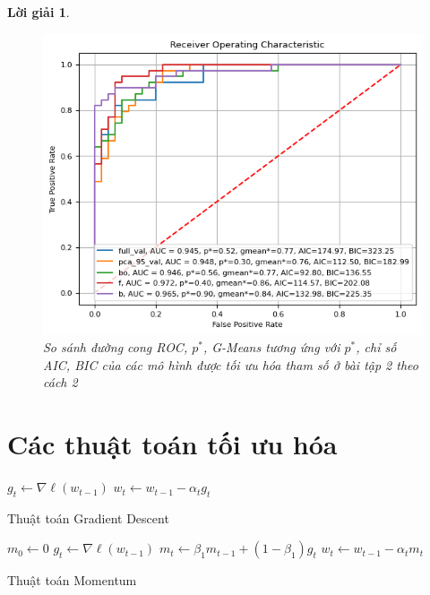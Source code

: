 \documentclass[14pt, a4paper]{article}
\theoremstyle{sltheorem}
\theoremstyle{soltheorem}
\newtheorem*{loigiai}{Lời giải}
\begin{document}
\begin{loigiai}
    \begin{figure}[h!]
        \centering
        \includegraphics[width=1.0\textwidth]{figures/ROC_Curve_AIC_BIC_Excercise_2_2.png}
        \caption{ So sánh đường cong ROC, $p^*$, G-Means tương ứng với $p^*$, chỉ số AIC, BIC của các mô hình được tối ưu hóa tham số ở bài tập 2 theo cách 2}
        \label{fig:ROC_Curve_AIC_BIC_Excercise_2_2}
    \end{figure}
\end{loigiai}

\newpage
\printbibliography[title={TÀI LIỆU THAM KHẢO}]

\newpage
\appendix

\section{Các thuật toán tối ưu hóa} \label{Optimization-Algorithms}


\begin{algorithm}[h!]
    \DontPrintSemicolon

     {
        $g_t \gets \nabla \ell(w_{t-1})$\;
        $w_t \gets w_{t-1} - \alpha_t g_t$
    }
    \;
    \caption{Thuật toán Gradient Descent}
\end{algorithm}


\begin{algorithm}[h!]
    \DontPrintSemicolon
    $m_0 \gets 0$\;
     {
        $g_t \gets \nabla \ell(w_{t-1})$\;
        $m_t \gets \beta_1 m_{t-1} + (1-\beta_1) g_t$\;
        $w_t \gets w_{t-1} - \alpha_t m_t$\;
    }
    \;
    \caption{Thuật toán Momentum}
\end{algorithm}
\end{document}
